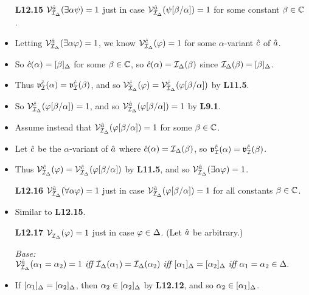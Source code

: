 \documentclass[a4paper, 11pt]{article} %
\begin{document}
\begin{itemize}
  \item[\bf L12.15] $\mathcal{V}_{\mathcal{I}_{\Delta}}^{\hat{a}}(\exists \alpha\psi)=1$ just in case $\mathcal{V}_{\mathcal{I}_{\Delta}}^{\hat{a}}(\psi[\beta/\alpha])=1$ for some constant $\beta\in\mathbb{C}$.
  \item Letting $\mathcal{V}_{\mathcal{I}_{\Delta}}^{\hat{a}}(\exists \alpha\varphi)=1$, we know $\mathcal{V}_{\mathcal{I}_{\Delta}}^{\hat{c}}(\varphi)=1$ for some $\alpha$-variant $\hat{c}$ of $\hat{a}$.
  \item So $\hat{c}(\alpha)=[\beta]_{\Delta}$ for some $\beta\in\mathbb{C}$, so $\hat{c}(\alpha)=\mathcal{I}_{\Delta}(\beta)$ since $\mathcal{I}_{\Delta}(\beta)=[\beta]_{\Delta}$.
  \item Thus $\mathfrak{v}_{\mathcal{I}}^{\hat{c}}(\alpha)=\mathfrak{v}_{\mathcal{I}}^{\hat{c}}(\beta)$, and so $\mathcal{V}_{\mathcal{I}_{\Delta}}^{\hat{c}}(\varphi)=\mathcal{V}_{\mathcal{I}_{\Delta}}^{\hat{c}}(\varphi[\beta/\alpha])$ by \textbf{L11.5}.
  \item So $\mathcal{V}_{\mathcal{I}_{\Delta}}^{\hat{c}}(\varphi[\beta/\alpha])=1$, and so $\mathcal{V}_{\mathcal{I}_{\Delta}}^{\hat{a}}(\varphi[\beta/\alpha])=1$ by \textbf{L9.1}.
  \item Assume instead that $\mathcal{V}_{\mathcal{I}_{\Delta}}^{\hat{a}}(\varphi[\beta/\alpha])=1$ for some $\beta\in\mathbb{C}$.
  \item Let $\hat{c}$ be the $\alpha$-variant of $\hat{a}$ where $\hat{c}(\alpha)=\mathcal{I}_{\Delta}(\beta)$, so $\mathfrak{v}_{\mathcal{I}}^{\hat{c}}(\alpha)=\mathfrak{v}_{\mathcal{I}}^{\hat{c}}(\beta)$.
  \item Thus $\mathcal{V}_{\mathcal{I}_{\Delta}}^{\hat{c}}(\varphi)=\mathcal{V}_{\mathcal{I}_{\Delta}}^{\hat{c}}(\varphi[\beta/\alpha])$ by \textbf{L11.5}, and so $\mathcal{V}_{\mathcal{I}_{\Delta}}^{\hat{a}}(\exists \alpha\varphi)=1$.
  \item[\bf L12.16] $\mathcal{V}_{\mathcal{I}_{\Delta}}^{\hat{a}}(\forall \alpha\varphi)=1$ just in case $\mathcal{V}_{\mathcal{I}_{\Delta}}^{\hat{a}}(\varphi[\beta/\alpha])=1$ for all constants $\beta\in\mathbb{C}$.
    \setcounter{enumi}{0}
  \item Similar to \textbf{L12.15}.
  \item[\bf L12.17] $\mathcal{V}_{\mathcal{I}_{\Delta}}^{}(\varphi)=1$ just in case $\varphi\in\Delta$. \quad(Let $\hat{a}$ be arbitrary.)
    \setcounter{enumi}{0}
  \item[\it Base:] 
    $\mathcal{V}_{\mathcal{I}_{\Delta}}^{\hat{a}}(\alpha_1=\alpha_2)=1
      \textit{ iff } \mathcal{I}_{\Delta}(\alpha_1)=\mathcal{I}_{\Delta}(\alpha_2)
      \textit{ iff } [\alpha_1]_{\Delta}=[\alpha_2]_{\Delta}
      \textit{ iff } \alpha_1=\alpha_2\in\Delta.$
  \item If $[\alpha_1]_{\Delta}=[\alpha_2]_{\Delta}$, then $\alpha_2\in[\alpha_2]_{\Delta}$ by \textbf{L12.12}, and so $\alpha_2\in[\alpha_1]_{\Delta}$.

\end{itemize}
\end{document}
